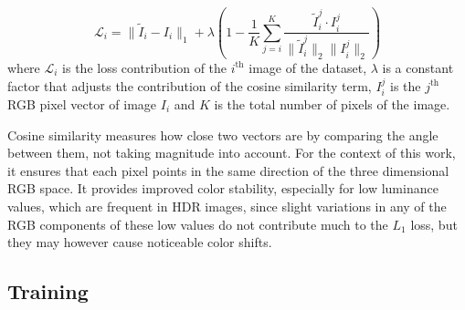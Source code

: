 \documentclass{egpubl}
\begin{document}
\begin{equation}
    \mathcal{L}_{i} =  \lVert \tilde{I}_{i} - I_{i}
    \rVert_{1} + \lambda  \left( 1 -
    \frac{1}{K}\sum_{j=i}^{K}
    \frac{\tilde{I}_{i}^{j} \cdot I_{i}^{j}}{\lVert
    \tilde{I}_{i}^{j}\rVert_{2}\lVert I_{i}^{j}\rVert_{2}}  \right)
    \label{eq:Loss}
\end{equation}
where $\mathcal{L}_{i}$ is the loss contribution of the $i^{\text{th}}$ image
of the dataset, $\lambda$ is a constant factor that adjusts the contribution of
the cosine similarity term, $I_{i}^{j}$ is the $j^{\text{th}}$ RGB pixel vector
of image $I_i$ and $K$ is the total number of pixels of the image.

Cosine similarity measures how close two vectors are by comparing the angle
between them, not taking magnitude into account. For the context of this work,
it ensures that each pixel points in the same direction of the three
dimensional RGB space. It provides improved color stability, especially for low
luminance values, which are frequent in HDR images, since slight variations in any of
the RGB components of these low values do not contribute much to the $L_1$
loss, but they may however cause noticeable color shifts.  
\subsection{\textbf{Training}}
\end{document}
